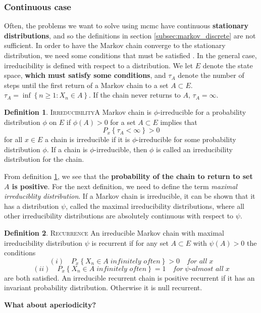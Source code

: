 \documentclass{article}
\theoremstyle{definition}
\newtheorem{definition}{Definition}[section]
\begin{document}
\subsubsection{Continuous case}
Often, the problems we want to solve using \gls{mcmc} have continuous \textbf{stationary distributions}, and so the definitions in section \ref{subsec:markov_discrete} are not sufficient. In order to have the Markov chain converge to the stationary distribution, we need some conditions that must be satisfied \cite{MCMC_in_pract}. In the general case, irreducibility is defined with respect to a distribution. We let $E$ denote the state space, \textbf{which must satisfy some conditions}, and $\tau_A$ denote the number of steps until the first return of a Markov chain to a set $A\subset E$.  $\tau_A = \inf\left\{n\geq 1 : X_n \in A\right\}$. If the chain never returns to $A$, $\tau_A = \infty$.
\begin{definition}{\textsc{Irreducibility}}\label{def:gen_irr}
   A Markov chain is $\phi$-irreducible for a probability distribution $\phi$ on $E$ if $\phi\left(A\right) > 0$ for a set $A\subset E$ implies that $$P_x\left\{\tau_A < \infty\right\} > 0$$ for all $x\in E$ a chain is irreducible if it is $\phi$-irreducible for some probability distribution $\phi$. If a chain is $\phi$-irreducible, then $\phi$ is called an irreducibility distribution for the chain. 
\end{definition}
From definition \ref{def:gen_irr}, we see that the \textbf{probability of the chain to return to set $A$ is positive}.  For the next definition, we need to define the term \textit{maximal irreduciblity distribution}. If a Markov chain is irreducible, it can be shown that it has a distribution $\psi$, called the maximal irreducibility distributions, where all other irreducibility distributions are absolutely continuous with respect to $\psi$.  
\begin{definition}{\textsc{Recurrence}}
An irreducible Markov chain with maximal irreducibility distribution $\psi$ is recurrent if for any set $A\subset E$ with $\psi\left(A\right)>0$ the conditions
$$(i)\quad P_x \left\{X_n \in A \; \textit{infinitely often}\right\} > 0\quad \textit{for all}\; x$$ 
$$(ii) \quad P_x\left\{X_n\in A \; \textit{infinitely often} \right\} = 1 \quad \textit{for}\;\psi \textit{-almost all} \; x$$
are both satisfied. An irreducible recurrent chain is positive recurrent if it has an invariant probability distribution. Otherwise it is null recurrent. 
\end{definition}
\textbf{What about aperiodicity?}
\end{document}
